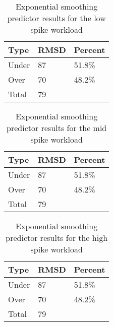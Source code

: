
\begin{table}[H]
\centering
\begin{tabular}{| l | l | l |}
\hline
Type & RMSD & Percent \\ \hline
Under & 87 & 51.8\% \\ \hline
Over & 70 & 48.2\% \\ \hline
Total & 79 & \\ \hline
\end{tabular}
\caption{Exponential smoothing predictor results for the low spike workload}
\end{table}

\begin{table}[H]
\centering
\begin{tabular}{| l | l | l |}
\hline
Type & RMSD & Percent \\ \hline
Under & 87 & 51.8\% \\ \hline
Over & 70 & 48.2\% \\ \hline
Total & 79 & \\ \hline
\end{tabular}
\caption{Exponential smoothing predictor results for the mid spike workload}
\end{table}

\begin{table}[H]
\centering
\begin{tabular}{| l | l | l |}
\hline
Type & RMSD & Percent \\ \hline
Under & 87 & 51.8\% \\ \hline
Over & 70 & 48.2\% \\ \hline
Total & 79 & \\ \hline
\end{tabular}
\caption{Exponential smoothing predictor results for the high spike workload}
\end{table}